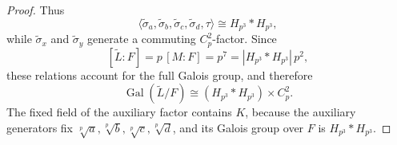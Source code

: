 \documentclass[10pt,a4paper]{amsart}
\DeclareMathOperator{\Gal}{Gal}
\newcommand{\Hp}{H_{p^3}}
\begin{document}
\begin{proof}
Thus
\[
 \langle\widetilde\sigma_a,\widetilde\sigma_b,
 \widetilde\sigma_c,\widetilde\sigma_d,\tau\rangle
 \cong\Hp*\Hp,
\]
while $\widetilde\sigma_x$ and $\widetilde\sigma_y$ generate a commuting
$C_p^2$-factor. Since
\[
 [\widetilde L:F]=p\,[M:F]=p^7=|\Hp*\Hp|\,p^2,
\]
these relations account for the full Galois group, and therefore
\[
 \Gal(\widetilde L/F)\cong(\Hp*\Hp)\times C_p^2.
\]
The fixed field of the auxiliary factor contains $K$, because the auxiliary
generators fix $\sqrt[p]{a},\sqrt[p]{b},\sqrt[p]{c},\sqrt[p]{d}$, and its
Galois group over $F$ is $\Hp*\Hp$.
\end{proof}
\end{document}
